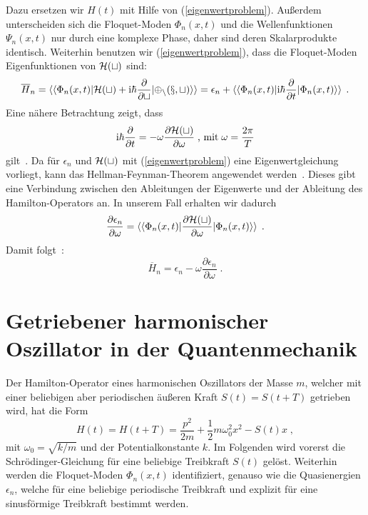     Dazu ersetzen wir $H(t)$ mit Hilfe von (\ref{eigenwertproblem}).
    Außerdem unterscheiden sich die Floquet-Moden $\Phi_n(x,t)$ und die Wellenfunktionen $\Psi_n(x,t)$ nur durch eine komplexe Phase, daher sind deren Skalarprodukte identisch.
    Weiterhin benutzen wir (\ref{eigenwertproblem}), dass die Floquet-Moden Eigenfunktionen von $\cal{H}(t)$ sind:
    \begin{align}
      \begin{split}
      \overline{H}_n  = \braket{\braket{\Phi_n(x,t)|\cal{H}(t)+\text{i}\hbar\frac{\partial}{\partial t}|\Phi_n(x,t)}}
      = \epsilon_n + \braket{\braket{\Phi_n(x,t)|\text{i}\hbar\frac{\partial}{\partial t}|\Phi_n(x,t)}} \; .
    \end{split}
    \end{align}
    Eine nähere Betrachtung zeigt, dass
    \begin{equation}
      \text{i}\hbar\frac{\partial}{\partial t} = -\omega \frac{\partial \cal{H}(t)}{\partial \omega} \;\text{, mit}\; \omega=\frac{2\pi}{T}
    \end{equation}
    gilt~\cite{haengi}.
    Da für $\epsilon_n$ und $\cal H(t)$ mit (\ref{eigenwertproblem}) eine Eigenwertgleichung vorliegt, kann das Hellman-Feynman-Theorem angewendet werden~\cite{hellmann}.
    Dieses gibt eine Verbindung zwischen den Ableitungen der Eigenwerte und der Ableitung des Hamilton-Operators an.
    In unserem Fall erhalten wir dadurch
    \begin{equation}
      \frac{\partial \epsilon_n}{\partial \omega} = \braket{\braket{\Phi_n(x,t)|\frac{\partial \cal H(t)}{\partial \omega}|\Phi_n(x,t)}} \; .
    \end{equation}
    Damit folgt~\cite{haengi}:
    \begin{equation}
      \overline{H}_n = \epsilon_n - \omega\frac{\partial \epsilon_n}{\partial \omega} \; .
      \label{mittleres_H}
    \end{equation}

\iffalse
    \chapter{Getriebener harmonischer Oszillator in der Quantenmechanik}
      Der Hamilton-Operator eines harmonischen Oszillators der Masse $m$, welcher mit einer beliebigen aber periodischen äußeren Kraft $S(t)=S(t+T)$ getrieben wird, hat die Form
      \begin{equation}
        H(t) = H(t+T) = \frac{p^2}{2m} + \frac{1}{2}m\omega_0^2x^2-S(t)x \; ,
        \label{H_einzelner}
      \end{equation}
      mit $\omega_0=\sqrt{k/m}$ und der Potentialkonstante $k$.
      Im Folgenden wird vorerst die Schrödinger-Gleichung für eine beliebige Treibkraft $S(t)$ gelöst.
      Weiterhin werden die Floquet-Moden $\Phi_n(x,t)$ identifiziert, genauso wie die Quasienergien $\epsilon_n$, welche für eine beliebige periodische Treibkraft und explizit für eine sinusförmige Treibkraft bestimmt werden.

